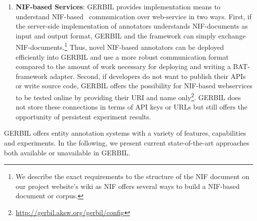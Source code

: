 \begin{enumerate}
\item \textbf{NIF-based Services}:
GERBIL provides implementation means to understand NIF-based~\cite{NIF} communication over web-service in two ways.
First, if the server-side implementation of annotators understands NIF-documents as input and output format, GERBIL and the framework can simply exchange NIF-documents.\footnote{We describe the exact requirements to the structure of the NIF document on our project website's wiki as NIF offers several ways to build a NIF-based document or corpus.}
Thus, novel NIF-based annotators can be deployed efficiently into GERBIL and use a more robust communication format compared to the amount of work necessary for deploying and writing a BAT-framework adapter.
Second, if developers do not want to publish their APIs or write source code, GERBIL offers the possibility for NIF-based webservices to be tested online by providing their URI and name only\footnote{\url{http://gerbil.aksw.org/gerbil/config}}. 
GERBIL does not store these connections in terms of API keys or URLs but still offers the opportunity of persistent experiment results.
\end{enumerate}

GERBIL offers \overallGERBILannotators entity annotation systems with a variety of features, capabilities and experiments.
In the following, we present current state-of-the-art approaches both available or unavailable in GERBIL.

